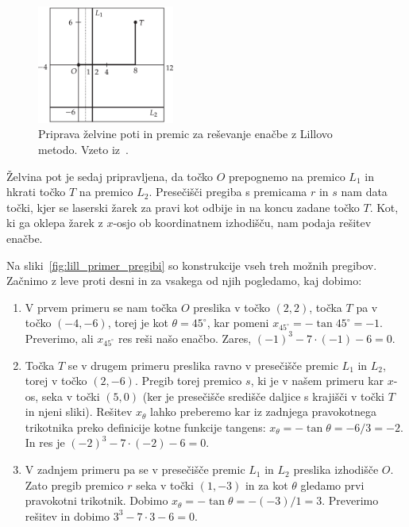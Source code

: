 \begin{figure}[h]
    \centering
    \includegraphics[width=0.4\textwidth]{images/kubična enačba/lill_primer_setup.png}
    \caption[Primer reševanja z Lillovo metodo (priprava)]{Priprava želvine poti in premic za reševanje enačbe z Lillovo metodo. Vzeto iz~\cite[str. 87]{hull2013}.}
    \label{fig:lill_primer1}
\end{figure}

Želvina pot je sedaj pripravljena, da točko $O$ prepognemo na premico $L_1$ in hkrati točko $T$ na premico $L_2$. Presečišči pregiba s premicama $r$ in $s$ nam data točki, kjer se laserski žarek za pravi kot odbije in na koncu zadane točko $T$. Kot, ki ga oklepa žarek z $x$-osjo ob koordinatnem izhodišču, nam podaja rešitev enačbe.

Na sliki~\ref{fig:lill_primer_pregibi} so konstrukcije vseh treh možnih pregibov. Začnimo z leve proti desni in za vsakega od njih pogledamo, kaj dobimo:
\begin{enumerate}
    \item V prvem primeru se nam točka $O$ preslika v točko $(2,2)$, točka $T$ pa v točko $(-4,-6)$, torej je kot $\theta = 45^\circ$, kar pomeni $x_{45^\circ} = -\tan 45^\circ = -1$. Preverimo, ali $x_{45^\circ}$ res reši našo enačbo. Zares, $(-1)^3 - 7\cdot(-1) - 6 = 0$.
    \item Točka $T$ se v drugem primeru preslika ravno v presečišče premic $L_1$ in $L_2$, torej v točko $(2,-6)$. Pregib torej premico $s$, ki je v našem primeru kar $x$-os, seka v točki $(5,0)$ (ker je presečišče središče daljice s krajišči v točki $T$ in njeni sliki). Rešitev $x_\theta$ lahko preberemo kar iz zadnjega pravokotnega trikotnika preko definicije kotne funkcije tangens: $x_\theta = -\tan \theta = -6/3 = -2$. In res je $(-2)^3 - 7\cdot(-2) - 6 = 0$.
    \item V zadnjem primeru pa se v presečišče premic $L_1$ in $L_2$ preslika izhodišče $O$. Zato pregib premico $r$ seka v točki $(1,-3)$ in za kot $\theta$ gledamo prvi pravokotni trikotnik. Dobimo $x_\theta = -\tan \theta = -(-3)/1 = 3$. Preverimo rešitev in dobimo $3^3 - 7\cdot3 - 6 = 0$.
\end{enumerate}

